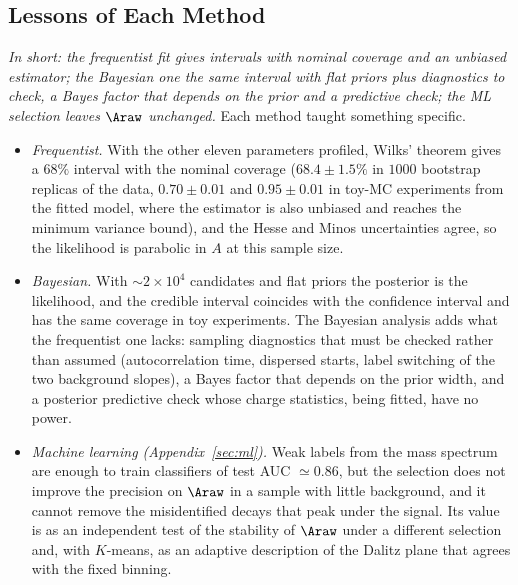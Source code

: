 \subsection{Lessons of Each Method}
\emph{In short: the frequentist fit gives intervals with nominal coverage and an unbiased estimator; the Bayesian one the same interval with flat priors plus diagnostics to check, a Bayes factor that depends on the prior and a predictive check; the ML selection leaves $\Araw$ unchanged.}
Each method taught something specific.
\begin{itemize}[leftmargin=*,itemsep=2pt]
\item \emph{Frequentist.} With the other eleven parameters profiled, Wilks' theorem gives a $68\%$ interval with the nominal coverage ($68.4\pm1.5\%$ in $1000$ bootstrap replicas of the data, $0.70\pm0.01$ and $0.95\pm0.01$ in toy-MC experiments from the fitted model, where the estimator is also unbiased and reaches the minimum variance bound), and the Hesse and Minos uncertainties agree, so the likelihood is parabolic in $A$ at this sample size.
\item \emph{Bayesian.} With $\sim2\times10^4$ candidates and flat priors the posterior is the likelihood, and the credible interval coincides with the confidence interval and has the same coverage in toy experiments. The Bayesian analysis adds what the frequentist one lacks: sampling diagnostics that must be checked rather than assumed (autocorrelation time, dispersed starts, label switching of the two background slopes), a Bayes factor that depends on the prior width, and a posterior predictive check whose charge statistics, being fitted, have no power.
\item \emph{Machine learning (Appendix~\ref{sec:ml}).} Weak labels from the mass spectrum are enough to train classifiers of test AUC $\simeq0.86$, but the selection does not improve the precision on $\Araw$ in a sample with little background, and it cannot remove the misidentified decays that peak under the signal. Its value is as an independent test of the stability of $\Araw$ under a different selection and, with $K$-means, as an adaptive description of the Dalitz plane that agrees with the fixed binning.
\end{itemize}

